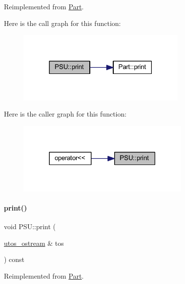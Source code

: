 Reimplemented from \mbox{\hyperlink{class_part_a4fa402b8e8fd4236ff773a7697ab2bc3}{Part}}.

Here is the call graph for this function\+:
\nopagebreak
\begin{figure}[H]
\begin{center}
\leavevmode
\includegraphics[width=237pt]{class_p_s_u_ad8f95676e09f5ba805dbba50759f44ba_cgraph}
\end{center}
\end{figure}
Here is the caller graph for this function\+:
\nopagebreak
\begin{figure}[H]
\begin{center}
\leavevmode
\includegraphics[width=242pt]{class_p_s_u_ad8f95676e09f5ba805dbba50759f44ba_icgraph}
\end{center}
\end{figure}
\mbox{\label{class_p_s_u_a81c74aa3a327003c58b89ca2b8602c1d}} 
\paragraph{\texorpdfstring{print()}{print()}\hspace{0.1cm}{\footnotesize\ttfamily [2/4]}}
{\footnotesize\ttfamily void P\+S\+U\+::print (\begin{DoxyParamCaption}\item[{\mbox{\hyperlink{structutos__ostream}{utos\+\_\+ostream}} \&}]{tos }\end{DoxyParamCaption}) const\hspace{0.3cm}{\ttfamily [virtual]}}



Reimplemented from \mbox{\hyperlink{class_part_a9ecabe44ba3415badf82c6a23617a41e}{Part}}.

